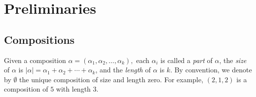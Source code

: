 \documentclass[11pt]{amsart}
\numberwithin{equation}{section}
\newcommand{\NCQSym}{\mathrm{NCQSym}}
\newcommand{\NCSym}{\mathrm{NCSym}}
\newcommand{\Sym}{\mathrm{Sym}}
\newcommand{\scrY}{{\mathscr{Y}}}
\newcommand{\scrE}{{\mathscr{E}}}
\newcommand{\scrF}{{\mathscr{F}}}
\newcommand{\bfone}{{\mathbf{1}}}
\newcommand{\bftwo}{{\mathbf{2}}}
\newcommand{\bfn}{{\mathbf{n}}}
\newcommand{\bfdet}{{\mathbf{det}}}
\newcommand{\frakS}{{\mathfrak{S}}}
\newcommand{\bfj}{{\mathbf{j}}}
\newcommand{\bfi}{{\mathbf{i}}}
\newcommand{\bfh}{{\mathbf{h}}}
\newcommand{\bfe}{{\mathbf{e}}}
\newcommand{\bfp}{{\mathbf{p}}}
\newcommand{\bfs}{{\mathbf{s}}}
\begin{document}
%
%
%
%
%
%
%
%
%
%




\section{Preliminaries}\label{sec:per}

\subsection{Compositions}  
 Given a composition $\alpha=(\alpha_1,\alpha_2,\ldots, \alpha_k),$ each $\alpha_i$ is called a \emph{part} of $\alpha$, the \emph{size} of $\alpha$ is $|\alpha|=\alpha_1+\alpha_2+\cdots+\alpha_k$, and the \emph{length} of $\alpha$ is $k$. By convention, we denote by $\emptyset$ the unique composition of size and length zero.  For example, $(2,1,2)$ is a composition of $5$ with length $3$.
 
\end{document}
